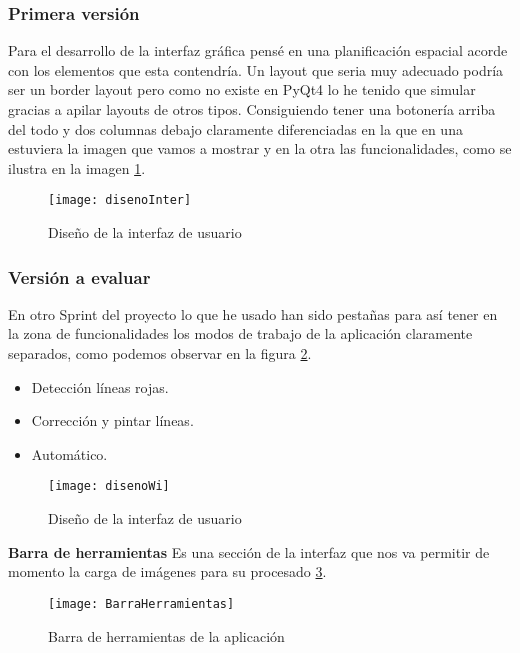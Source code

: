 \subsubsection{Primera versión}

Para el desarrollo de la interfaz gráfica pensé en una planificación espacial acorde con los elementos que esta contendría.
Un layout que seria muy adecuado podría ser un border layout pero como no existe en PyQt4 lo he tenido que simular gracias a apilar layouts de otros tipos.
Consiguiendo tener una botonería arriba del todo y dos columnas debajo claramente diferenciadas en la que en una estuviera la imagen que vamos a mostrar y en la otra las funcionalidades, como se ilustra en la imagen \ref{fig:5.8}.

\begin{figure}[h]
\centering
\texttt{[image: disenoInter]}
\caption{Diseño de la interfaz de usuario}
\label{fig:5.8}
\end{figure}

\subsubsection{Versión a evaluar}

En otro Sprint del proyecto lo que he usado han sido pestañas para así tener en la zona de funcionalidades los modos de trabajo de la aplicación claramente separados, como podemos observar en la figura \ref{fig:5.9}.

\begin{itemize}
\item Detección líneas rojas.
\item Corrección y pintar líneas.
\item Automático.
\end{itemize}


\begin{figure}[h]
\centering
\texttt{[image: disenoWi]}
\caption{Diseño de la interfaz de usuario}
\label{fig:5.9}
\end{figure}

\textbf{Barra de herramientas}
Es una sección de la interfaz que nos va permitir de momento la carga de imágenes para su procesado \ref{fig:5.10}.
\begin{figure}[h]
\centering
\texttt{[image: BarraHerramientas]}
\caption{Barra de herramientas de la aplicación}
\label{fig:5.10}
\end{figure}


